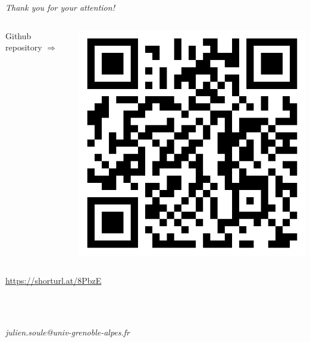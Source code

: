 

\section*{\phantom{Thanks}}

\begin{frame}{}

  \vspace{6ex}

  \centering
  {
    \Huge
    \emph{Thank you for your attention!}
  }

  \vspace{6ex}

  \begin{columns}

    \hspace{-27ex}

    \begin{column}{0.5\textwidth}
      \raggedleft
      {\Large Github repository $\Longrightarrow$}
    \end{column}

    \hspace{-12ex}

    \begin{column}{0.5\textwidth}
      \includegraphics[width=0.5\linewidth]{figures/qr_code.png}
    \end{column}

  \end{columns}

  \vspace{3ex}

  \centering
  {\Large
    \url{https://shorturl.at/8PbzE }}

  \ \\
  
  \

  \textit{julien.soule@univ-grenoble-alpes.fr}

\end{frame}

